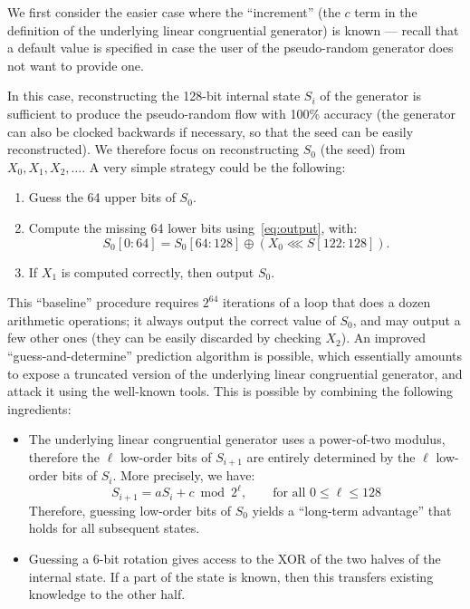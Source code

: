 \documentclass[preprint,svgnames]{iacrtrans}
\begin{document}
We first consider the easier case where the ``increment'' (the $c$ term in the
definition of the underlying linear congruential generator) is known --- recall
that a default value is specified in case the user of the pseudo-random
generator does not want to provide one.

In this case, reconstructing the 128-bit internal state $S_i$ of the generator
is sufficient to produce the pseudo-random flow with 100\% accuracy (the
generator can also be clocked backwards if necessary, so that the seed can be
easily reconstructed). We therefore focus on reconstructing $S_0$ (the seed)
from $X_0, X_1, X_2, \dots$. A very simple strategy could be the following:
\begin{enumerate}
\item Guess the 64 upper bits of $S_0$.
\item Compute the missing 64 lower bits using~\eqref{eq:output}, with:
\[
   S_0[0:64] = S_0[64:128] \oplus (X_0  \lll S[122:128]).
\]
\item If $X_1$ is computed correctly, then output $S_0$.
\end{enumerate}

This ``baseline'' procedure requires $2^{64}$ iterations of a loop that does a
dozen arithmetic operations; it always output the correct value of $S_0$, and
may output a few other ones (they can be easily discarded by checking $X_2$). An
improved ``guess-and-determine'' prediction algorithm is possible, which
essentially amounts to expose a truncated version of the underlying linear
congruential generator, and attack it using the well-known tools. This is
possible by combining the following ingredients:
\begin{itemize}
\item The underlying linear congruential generator uses a power-of-two modulus,
  therefore the $\ell$ low-order bits of $S_{i+1}$ are entirely determined by
  the $\ell$ low-order bits of $S_i$. More precisely, we have:
  \begin{equation}\label{eq:lcg}
    S_{i+1} = aS_i + c \bmod 2^\ell, \qquad \text{for all } 0 \leq \ell \leq 128
  \end{equation}
  Therefore, guessing low-order bits of $S_0$ yields a ``long-term advantage''
  that holds for all subsequent states.

\item Guessing a 6-bit rotation gives access to the XOR of the two halves of the
  internal state. If a part of the state is known, then this transfers existing
  knowledge to the other half.
\end{itemize}
\end{document}
